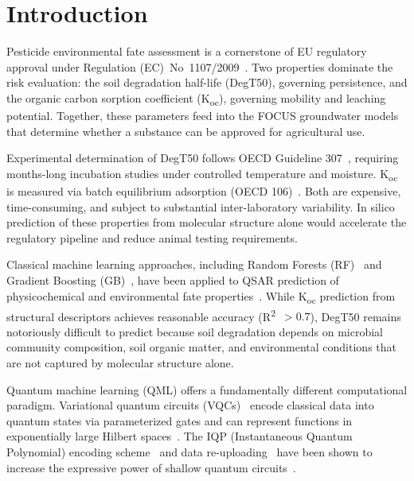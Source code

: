 \documentclass[12pt,a4paper]{article}
\newcommand{\degtl}{DegT50}
\newcommand{\koc}{K\textsubscript{oc}}
\newcommand{\rtwo}{R\textsuperscript{2}}
\begin{document}
\newpage
\tableofcontents
\newpage

\section{Introduction}
\label{sec:intro}

Pesticide environmental fate assessment is a cornerstone of EU regulatory
approval under Regulation (EC)~No~1107/2009~\citep{ec1107_2009}. Two
properties dominate the risk evaluation: the soil degradation half-life
(\degtl{}), governing persistence, and the organic carbon sorption
coefficient (\koc{}), governing mobility and leaching potential. Together,
these parameters feed into the FOCUS groundwater models~\citep{focus2006}
that determine whether a substance can be approved for agricultural use.

Experimental determination of \degtl{} follows OECD Guideline
307~\citep{oecd307}, requiring months-long incubation studies under
controlled temperature and moisture. \koc{} is measured via batch
equilibrium adsorption (OECD 106)~\citep{oecd106}. Both are expensive,
time-consuming, and subject to substantial inter-laboratory variability.
In silico prediction of these properties from molecular structure alone
would accelerate the regulatory pipeline and reduce animal testing
requirements.

Classical machine learning approaches, including Random Forests
(RF)~\citep{breiman2001} and Gradient Boosting (GB)~\citep{friedman2001},
have been applied to QSAR prediction of physicochemical and environmental
fate properties~\citep{mansouri2018}. While \koc{} prediction from
structural descriptors achieves reasonable accuracy (\rtwo{}~$> 0.7$),
\degtl{} remains notoriously difficult to predict because soil degradation
depends on microbial community composition, soil organic matter, and
environmental conditions that are not captured by molecular structure alone.

Quantum machine learning (QML) offers a fundamentally different
computational paradigm. Variational quantum circuits
(VQCs)~\citep{cerezo2021} encode classical data into quantum states via
parameterized gates and can represent functions in exponentially large
Hilbert spaces~\citep{havlicek2019}. The IQP (Instantaneous Quantum
Polynomial) encoding scheme~\citep{schuld2019iqp} and data
re-uploading~\citep{perezslava2020} have been shown to increase the
expressive power of shallow quantum circuits~\citep{schuld2020}.
\end{document}
